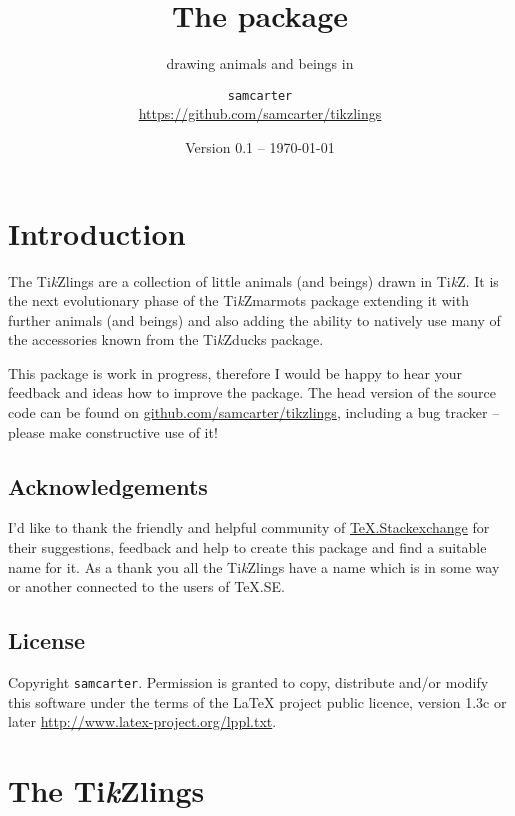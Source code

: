 \documentclass[parskip=half]{scrartcl}
\title{The \texorpdfstring{\tikzlings}{tikzlings} package}
\subtitle{drawing animals and beings in \TikZ}
\author{%
	\texorpdfstring{\texttt{samcarter}\\[0.8em]
		\url{https://github.com/samcarter/tikzlings}
	}{samcarter}}
\date{Version 0.1 -- \today}
\newcommand{\CTAN}{\textsc{CTAN}\xspace}
\newcommand{\TikZ}{Ti\emph{k}Z\xspace}
\newcommand{\tikzducks}{Ti\emph{k}Zducks\xspace}
\newcommand{\tikzmarmots}{Ti\emph{k}Zmarmots\xspace}
\newcommand{\tikzlings}{Ti\emph{k}Zlings\xspace}
\newcommand{\miktex}{MiK\TeX\xspace}
\newcommand{\texlive}{\TeX{}Live\xspace}
\begin{document}
\maketitle
\thispagestyle{scrheadings}

\section*{Introduction}
\label{intro}

The \tikzlings are a collection of little animals (and beings) drawn in \TikZ. It is the next evolutionary phase of the \tikzmarmots package extending it with further animals (and beings) and also adding the ability to natively use many of the accessories known from the \tikzducks package. 

This package is work in progress, therefore I would be happy to hear your feedback and ideas how to improve the package. 
The head version of the source code can be found on \url{github.com/samcarter/tikzlings}, including a bug tracker -- please make constructive use of it! 

\subsection*{Acknowledgements}

I'd like to thank the friendly and helpful community of \href{https://tex.stackexchange.com/}{TeX.Stackexchange} for their suggestions, feedback and help to create this package and find a suitable name for it. As a thank you all the \tikzlings have a name which is in some way or another connected to the users of TeX.SE.

\subsection*{License}

Copyright 
\texttt{samcarter}. Permission is granted to copy, distribute and\slash or modify this software under the terms of the LaTeX project public licence, version 1.3c or later \url{http://www.latex-project.org/lppl.txt}.

\clearpage
\section*{The \tikzlings}
\end{document}
